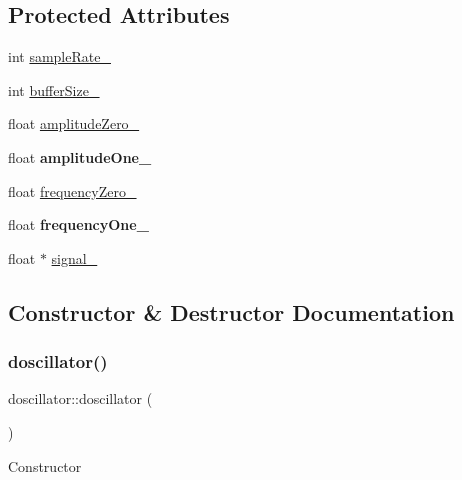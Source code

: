 \subsection*{Protected Attributes}
\begin{DoxyCompactItemize}
\item 
int \hyperlink{classdoscillator_a5fe15276f152065a48770c03f9a3ff33}{sample\+Rate\+\_\+}
\item 
int \hyperlink{classdoscillator_a7b467df496d9663cf67153b6f5fa75c7}{buffer\+Size\+\_\+}
\item 
float \hyperlink{classdoscillator_ad426d1b764a7a2547ebe33a0282cdbe1}{amplitude\+Zero\+\_\+}
\item 
\mbox{\label{classdoscillator_a0bc2fe798d1a43498f049c13434a03a3}} 
float {\bfseries amplitude\+One\+\_\+}
\item 
float \hyperlink{classdoscillator_ab851529b58c9569c3a1e2baacf785f05}{frequency\+Zero\+\_\+}
\item 
\mbox{\label{classdoscillator_adfd283dc4da9f5e822a393b9502659f9}} 
float {\bfseries frequency\+One\+\_\+}
\item 
float $\ast$ \hyperlink{classdoscillator_a4ebb6a37be6a061d025c3f80ee4de6a2}{signal\+\_\+}
\end{DoxyCompactItemize}


\subsection{Constructor \& Destructor Documentation}
\mbox{\label{classdoscillator_a8b5fa400c8ae5fd605781b7487595511}} 
\subsubsection{\texorpdfstring{doscillator()}{doscillator()}}
{\footnotesize\ttfamily doscillator\+::doscillator (\begin{DoxyParamCaption}{ }\end{DoxyParamCaption})}

Constructor \mbox{\label{classdoscillator_abf348b0e86d77618b2b3bc873a451a97}} 
